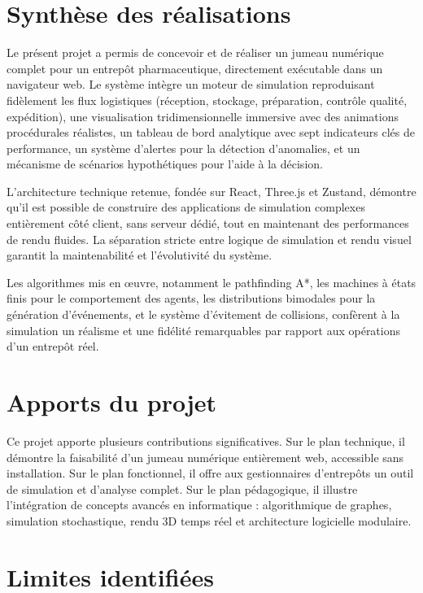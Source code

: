 \documentclass[12pt,a4paper]{report}
\begin{document}
\section{Synth\`ese des r\'ealisations}

Le pr\'esent projet a permis de concevoir et de r\'ealiser un jumeau num\'erique complet pour un entrep\^ot pharmaceutique, directement ex\'ecutable dans un navigateur web. Le syst\`eme int\`egre un moteur de simulation reproduisant fid\`element les flux logistiques (r\'eception, stockage, pr\'eparation, contr\^ole qualit\'e, exp\'edition), une visualisation tridimensionnelle immersive avec des animations proc\'edurales r\'ealistes, un tableau de bord analytique avec sept indicateurs cl\'es de performance, un syst\`eme d'alertes pour la d\'etection d'anomalies, et un m\'ecanisme de sc\'enarios hypoth\'etiques pour l'aide \`a la d\'ecision.

L'architecture technique retenue, fond\'ee sur React, Three.js et Zustand, d\'emontre qu'il est possible de construire des applications de simulation complexes enti\`erement c\^ot\'e client, sans serveur d\'edi\'e, tout en maintenant des performances de rendu fluides. La s\'eparation stricte entre logique de simulation et rendu visuel garantit la maintenabilit\'e et l'\'evolutivit\'e du syst\`eme.

Les algorithmes mis en \oe uvre, notamment le pathfinding A*, les machines \`a \'etats finis pour le comportement des agents, les distributions bimodales pour la g\'en\'eration d'\'ev\'enements, et le syst\`eme d'\'evitement de collisions, conf\`erent \`a la simulation un r\'ealisme et une fid\'elit\'e remarquables par rapport aux op\'erations d'un entrep\^ot r\'eel.

\section{Apports du projet}

Ce projet apporte plusieurs contributions significatives. Sur le plan technique, il d\'emontre la faisabilit\'e d'un jumeau num\'erique enti\`erement web, accessible sans installation. Sur le plan fonctionnel, il offre aux gestionnaires d'entrep\^ots un outil de simulation et d'analyse complet. Sur le plan p\'edagogique, il illustre l'int\'egration de concepts avanc\'es en informatique : algorithmique de graphes, simulation stochastique, rendu 3D temps r\'eel et architecture logicielle modulaire.

\section{Limites identifi\'ees}
\end{document}
